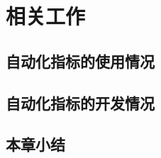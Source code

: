 
\chapter{相关工作}\label{ch:相关工作}
\section{自动化指标的使用情况}

\section{自动化指标的开发情况}

\section{本章小结}\label{sec:本章小结}
